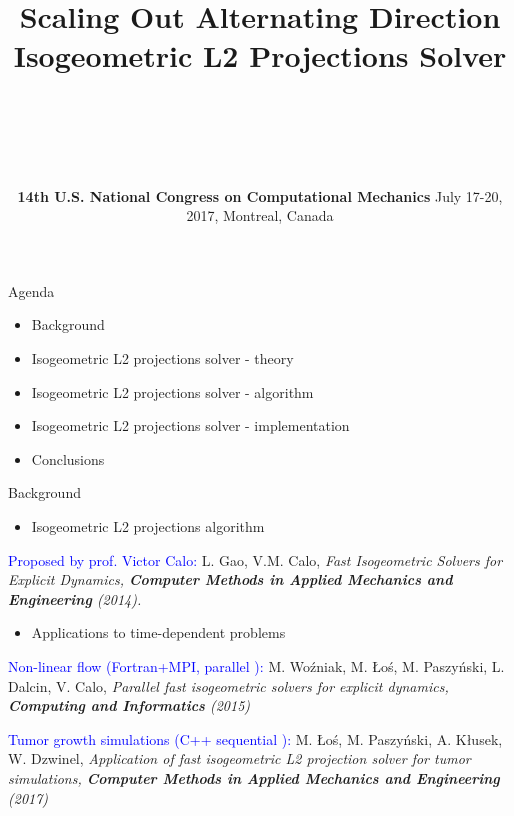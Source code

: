 \documentclass[c]{beamer}
\title{%
Scaling Out Alternating Direction Isogeometric L2 Projections Solver}
\author{%
    \inblue{\bf Grzegorz Gurgul (AGH)} \\
        \inblue{Bartosz~Bali\'{s} (AGH)} \\
    \inblue{Marcin \L{}o\'{s} (AGH)} \\
    \inblue{Danuta~Szeliga (AGH)} \\
      \inblue{Maciej Paszy\'{n}ski (AGH)} }
\date{{\bf 14th U.S. National Congress on Computational Mechanics} \break \break July 17-20, 2017, Montreal, Canada}
\newcommand{\inblue}[1]{\textcolor{blue}{#1}}
\begin{document}

\begin{frame}
  \titlepage
\end{frame}

\begin{frame}{Agenda}

\begin{itemize}
  \item Background
  \item Isogeometric L2 projections solver - theory
  \item Isogeometric L2 projections solver - algorithm
  \item Isogeometric L2 projections solver - implementation
  \item Conclusions
\end{itemize}

\end{frame}


\begin{frame}{Background}

{\small
\begin{itemize}
  \item Isogeometric L2 projections algorithm
\end{itemize}
  \inblue{Proposed by prof. Victor Calo:} 
L. Gao, V.M. Calo, \it{Fast Isogeometric Solvers for Explicit Dynamics}, {\bf Computer Methods in Applied Mechanics and Engineering} (2014). 
\begin{itemize}
  \item Applications to time-dependent problems
\end{itemize}
\inblue{Non-linear flow (Fortran+MPI, parallel ): }
M. Wo\'{z}niak, M. \L{}o\'{s}, M. Paszy\'{n}ski, L. Dalcin, V. Calo, 
\it{Parallel fast isogeometric solvers for explicit dynamics}, {\bf Computing and Informatics} (2015)
\vspace{2mm}

\inblue{Tumor growth simulations (C++ sequential ): }M. \L{}o\'{s}, M. Paszy\'{n}ski, A. K\l{}usek, W. Dzwinel, \it{Application of fast isogeometric L2 projection solver for tumor simulations}, {\bf Computer Methods in Applied Mechanics and Engineering} (2017)  
}

\end{frame}



\end{document}
